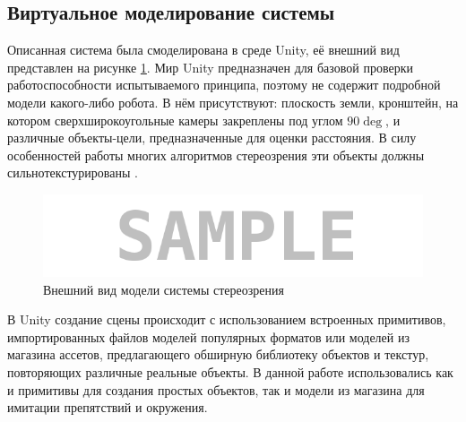 \subsection{Виртуальное моделирование системы}
Описанная система была смоделирована в среде Unity, её внешний вид представлен на рисунке \ref{pic:unity_model}. Мир 
Unity предназначен для базовой проверки работоспособности испытываемого принципа, поэтому не содержит подробной модели
какого-либо робота. В нём присутствуют: плоскость земли, кронштейн, на котором сверхширокоугольные камеры закреплены под углом $90\deg$, 
и различные объекты-цели, предназначенные для оценки расстояния. В силу особенностей работы многих алгоритмов стереозрения
эти объекты должны сильнотекстурированы \cite{}. %
\begin{figure}[H]
    \begin{center}
        \includegraphics[scale=0.5]{pics/sample.png}                                                                                            %
        \caption{Внешний вид модели системы стереозрения}
        \label{pic:unity_model}
    \end{center}
\end{figure}
В Unity создание сцены происходит с использованием встроенных примитивов, импортированных файлов моделей популярных форматов
или моделей из магазина ассетов, предлагающего обширную библиотеку объектов и текстур, повторяющих различные реальные объекты. В данной 
работе использовались как и примитивы для создания простых объектов, так и модели из магазина для имитации препятствий и окружения.

